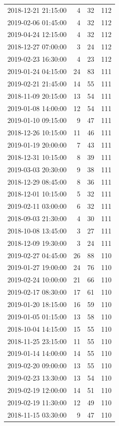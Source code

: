 \begin{tabular}{lrrr}
2018-12-21 21:15:00 & 4 & 32 & 112 \\
2019-02-06 01:45:00 & 4 & 32 & 112 \\
2019-04-24 12:15:00 & 4 & 32 & 112 \\
2018-12-27 07:00:00 & 3 & 24 & 112 \\
2019-02-23 16:30:00 & 4 & 23 & 112 \\
2019-01-24 04:15:00 & 24 & 83 & 111 \\
2019-02-21 21:45:00 & 14 & 55 & 111 \\
2018-11-09 20:15:00 & 13 & 54 & 111 \\
2019-01-08 14:00:00 & 12 & 54 & 111 \\
2019-01-10 09:15:00 & 9 & 47 & 111 \\
2018-12-26 10:15:00 & 11 & 46 & 111 \\
2019-01-19 20:00:00 & 7 & 43 & 111 \\
2018-12-31 10:15:00 & 8 & 39 & 111 \\
2019-03-03 20:30:00 & 9 & 38 & 111 \\
2018-12-29 08:45:00 & 8 & 36 & 111 \\
2018-12-01 10:15:00 & 5 & 32 & 111 \\
2019-02-11 03:00:00 & 6 & 32 & 111 \\
2018-09-03 21:30:00 & 4 & 30 & 111 \\
2018-10-08 13:45:00 & 3 & 27 & 111 \\
2018-12-09 19:30:00 & 3 & 24 & 111 \\
2019-02-27 04:45:00 & 26 & 88 & 110 \\
2019-01-27 19:00:00 & 24 & 76 & 110 \\
2019-02-24 10:00:00 & 21 & 66 & 110 \\
2019-02-17 08:30:00 & 17 & 61 & 110 \\
2019-01-20 18:15:00 & 16 & 59 & 110 \\
2019-01-05 01:15:00 & 13 & 58 & 110 \\
2018-10-04 14:15:00 & 15 & 55 & 110 \\
2018-11-25 23:15:00 & 11 & 55 & 110 \\
2019-01-14 14:00:00 & 14 & 55 & 110 \\
2019-02-20 09:00:00 & 13 & 55 & 110 \\
2019-02-23 13:30:00 & 13 & 54 & 110 \\
2019-02-19 12:00:00 & 14 & 51 & 110 \\
2019-02-19 11:30:00 & 12 & 49 & 110 \\
2018-11-15 03:30:00 & 9 & 47 & 110 \\

\end{tabular}
